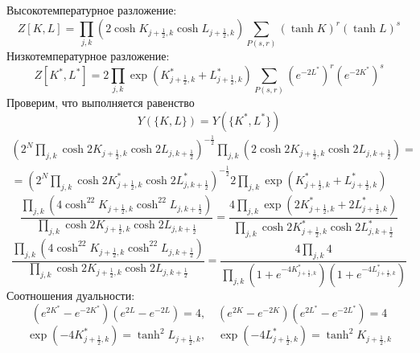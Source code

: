 \documentclass[12pt]{article}
\theoremstyle{definition}
\begin{document}
\begin{enumerate}
\begin{itemize}
\begin{equation}
    \end{equation}
    Высокотемпературное разложение:
    \begin{equation}
        Z[K,L]=\prod_{j,k}(2\cosh K_{j+\frac{1}{2},k}\cosh L_{j+\frac{1}{2},k})\sum\limits_{P(s,r)}(\tanh K)^r(\tanh L)^s
    \end{equation}
    Низкотемпературное разложение:
    \begin{equation}
        Z[K^*,L^*]=2\prod_{j,k}\exp(K^*_{j+\frac{1}{2},k}+L^*_{j+\frac{1}{2},k})\sum\limits_{P(s,r)}(e^{-2L^*})^r(e^{-2K^*})^s
    \end{equation}
    Проверим, что выполняется равенство
    \begin{equation}
        Y(\{K,L\})=Y(\{K^*,L^*\})
    \end{equation}
    \begin{multline}
        \left(2^N\prod\limits_{j,k}\cosh2K_{j+\frac{1}{2},k}\cosh2L_{j,k+\frac{1}{2}}\right)^{-\frac{1}{2}}\prod\limits_{j,k}(2\cosh2K_{j+\frac{1}{2},k}\cosh2L_{j,k+\frac{1}{2}})=\\=\left(2^N\prod\limits_{j,k}\cosh2K^*_{j+\frac{1}{2},k}\cosh2L^*_{j,k+\frac{1}{2}}\right)^{-\frac{1}{2}}2\prod\limits_{j,k}\exp(K^*_{j+\frac{1}{2},k}+L^*_{j+\frac{1}{2},k})
    \end{multline}
    \begin{equation}
        \frac{\prod\limits_{j,k}(4\cosh^22K_{j+\frac{1}{2},k}\cosh^22L_{j,k+\frac{1}{2}})}{\prod\limits_{j,k}\cosh2K_{j+\frac{1}{2},k}\cosh2L_{j,k+\frac{1}{2}}}=\frac{4\prod\limits_{j,k}\exp(2K^*_{j+\frac{1}{2},k}+2L^*_{j+\frac{1}{2},k})}{\prod\limits_{j,k}\cosh2K^*_{j+\frac{1}{2},k}\cosh2L^*_{j,k+\frac{1}{2}}}
    \end{equation}
    \begin{equation}
        \frac{\prod\limits_{j,k}(4\cosh^22K_{j+\frac{1}{2},k}\cosh^22L_{j,k+\frac{1}{2}})}{\prod\limits_{j,k}\cosh2K_{j+\frac{1}{2},k}\cosh2L_{j,k+\frac{1}{2}}}=\frac{4\prod\limits_{j,k}4}{\prod\limits_{j,k}(1+e^{-4K^*_{j+\frac{1}{2},k}})(1+e^{-4L^*_{j+\frac{1}{2},k}})}
    \end{equation}
    Соотношения дуальности:
    \begin{equation}
        (e^{2K^*}-e^{-2K^*})(e^{2L}-e^{-2L})=4,\quad (e^{2K}-e^{-2K})(e^{2L^*}-e^{-2L^*})=4
    \end{equation}
    \begin{equation}
        \exp(-4K^*_{j+\frac{1}{2},k})=\tanh^2L_{j+\frac{1}{2},k},\quad\exp(-4L^*_{j+\frac{1}{2},k})=\tanh^2K_{j+\frac{1}{2},k}
    \end{equation}

\end{itemize}
\end{enumerate}
\end{document}
